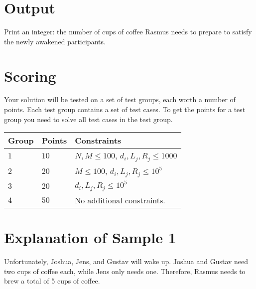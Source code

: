 \section*{Output}
Print an integer: the number of cups of coffee Rasmus needs to prepare to satisfy the newly awakened participants.

\section*{Scoring}
Your solution will be tested on a set of test groups, each worth a number of points. Each test group contains
a set of test cases. To get the points for a test group you need to solve all test cases in the test group.

\noindent
\begin{tabular}{| l | l | p{12cm} |}
  \hline
  \textbf{Group} & \textbf{Points} & \textbf{Constraints} \\ \hline
  $1$    & $10$       & $N, M \le 100$, $d_i, L_j, R_j \le 1000$ \\ \hline
  $2$    & $20$       & $M \le 100$, $d_i, L_j, R_j \le 10^5$ \\ \hline
  $3$    & $20$       & $d_i, L_j, R_j \le 10^5$ \\ \hline
  $4$    & $50$       & No additional constraints. \\ \hline
\end{tabular}

\section*{Explanation of Sample 1}
Unfortunately, Joshua, Jens, and Gustav will wake up. Joshua and Gustav need two cups of coffee each, while Jens only needs one.
Therefore, Rasmus needs to brew a total of 5 cups of coffee.

